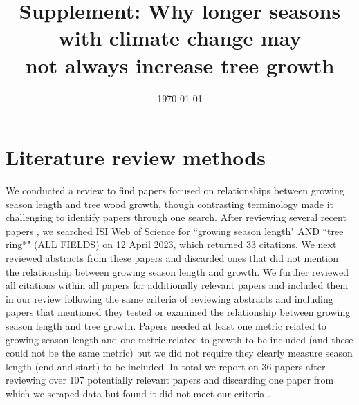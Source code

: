 \documentclass[11pt]{article}
\begin{document}
\renewcommand{\refname}{\CHead{}}


\title{Supplement: Why longer seasons with climate change may\\ not always increase tree growth}
\date{\today}
\maketitle

\renewcommand{\thetable}{S\arabic{table}}
\renewcommand{\thefigure}{S\arabic{figure}}


\section*{Literature review methods}

We conducted a review to find papers focused on relationships between growing season length and tree wood growth, though contrasting terminology made it challenging to identify papers through one search. After reviewing several recent papers \citep{dow2022warm,zohner2023effect}, we searched ISI Web of Science for ``growing season length" AND ``tree ring*" (ALL FIELDS) on 12 April 2023, which returned 33 citations. We next reviewed abstracts from these papers and discarded ones that did not mention the relationship between growing season length and growth. We further reviewed all citations within all papers for additionally relevant papers and included them in our review following the same criteria of reviewing abstracts and including papers that mentioned they tested or examined the relationship between growing season length and tree growth. Papers needed at least one metric related to growing season length and one metric related to growth to be included (and these could not be the same metric) but we did not require they clearly measure season length (end and start) to be included. In total we report on 36 papers after reviewing over 107 potentially relevant papers and discarding one paper from which we scraped data but found it did not meet our criteria \citep[][because it used tree rings as a metric of both growth and growing season length]{bruening2017}. %
\end{document}

